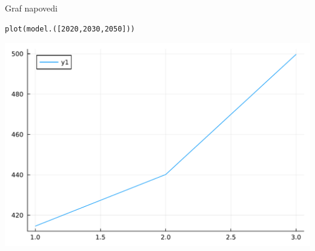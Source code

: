 \documentclass[12pt,a4paper]{article}
\begin{document}
Graf napovedi


\begin{verbatim}
plot(model.([2020,2030,2050]))
\end{verbatim}
\includegraphics[width=\linewidth]{jl_AuRI8c/demo_5_1.pdf}
\end{document}
